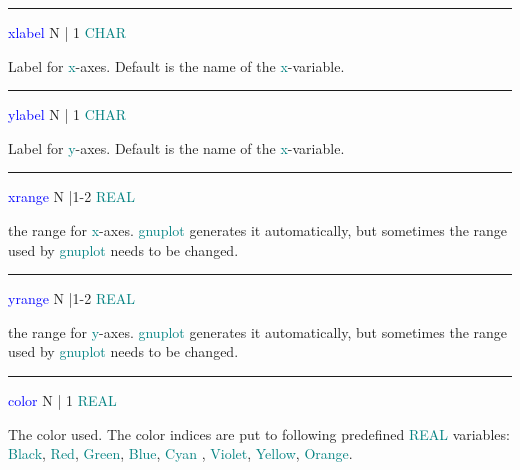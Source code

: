 \vspace{0.3cm} 
\hrule 
\vspace{0.3cm} 
\noindent \textcolor{blue}{xlabel}  \tabto{3cm}  N | 1 \tabto{5cm}  \textcolor{teal}{CHAR}  \tabto{7cm} 
\begin{changemargin}{3cm}{0cm} 
\noindent  Label for \textcolor{teal}{x}-axes. Default is the name of the \textcolor{teal}{x}-variable. 
\end{changemargin} 
\vspace{0.3cm} 
\hrule 
\vspace{0.3cm} 
\noindent \textcolor{blue}{ylabel}  \tabto{3cm}  N | 1 \tabto{5cm}  \textcolor{teal}{CHAR}  \tabto{7cm} 
\begin{changemargin}{3cm}{0cm} 
\noindent  Label for \textcolor{teal}{y}-axes. Default is the name of the \textcolor{teal}{x}-variable. 
\end{changemargin} 
\vspace{0.3cm} 
\hrule 
\vspace{0.3cm} 
\noindent \textcolor{blue}{xrange}  \tabto{3cm}  N |1-2 \tabto{5cm}   \textcolor{teal}{REAL} \tabto{7cm} 
\begin{changemargin}{3cm}{0cm} 
\noindent the range for \textcolor{teal}{x}-axes. \textcolor{teal}{gnuplot} generates it automatically, but 
sometimes the range used by \textcolor{teal}{gnuplot} needs to be changed. 
\end{changemargin} 
\vspace{0.3cm} 
\hrule 
\vspace{0.3cm} 
\noindent \textcolor{blue}{yrange}  \tabto{3cm}  N |1-2 \tabto{5cm}  \textcolor{teal}{REAL} \tabto{7cm} 
\begin{changemargin}{3cm}{0cm} 
\noindent  the range for \textcolor{teal}{y}-axes. \textcolor{teal}{gnuplot} generates it automatically, but 
sometimes the range used by \textcolor{teal}{gnuplot} needs to be changed. 
\end{changemargin} 
\vspace{0.3cm} 
\hrule 
\vspace{0.3cm} 
\noindent \textcolor{blue}{color}  \tabto{3cm}  N | 1  \tabto{5cm}   \textcolor{teal}{REAL}  \tabto{7cm} 
\begin{changemargin}{3cm}{0cm} 
\noindent  The color used. The color indices are put to 
following  predefined \textcolor{teal}{REAL} variables: \textcolor{teal}{Black}, \textcolor{teal}{Red}, \textcolor{teal}{Green}, \textcolor{teal}{Blue}, 
\textcolor{teal}{Cyan} , \textcolor{teal}{Violet}, \textcolor{teal}{Yellow}, \textcolor{teal}{Orange}. 
\end{changemargin} 
